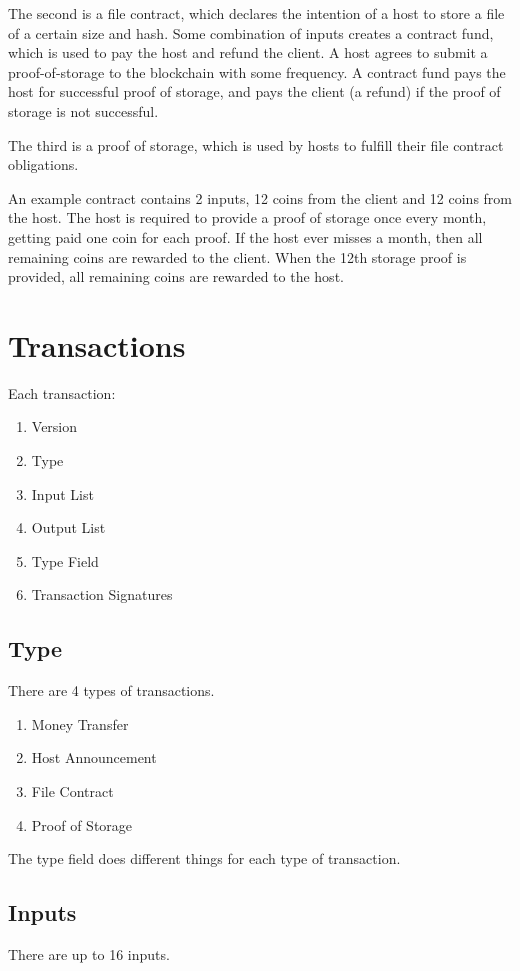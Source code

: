 \documentclass[twocolumn]{article}
\begin{document}
The second is a file contract, which declares the intention of a host to store a file of a certain size and hash.
Some combination of inputs creates a contract fund, which is used to pay the host and refund the client.
A host agrees to submit a proof-of-storage to the blockchain with some frequency.
A contract fund pays the host for successful proof of storage, and pays the client (a refund) if the proof of storage is not successful.

The third is a proof of storage, which is used by hosts to fulfill their file contract obligations.

An example contract contains 2 inputs, 12 coins from the client and 12 coins from the host.
The host is required to provide a proof of storage once every month, getting paid one coin for each proof.
If the host ever misses a month, then all remaining coins are rewarded to the client.
When the 12th storage proof is provided, all remaining coins are rewarded to the host.

\section{Transactions}
Each transaction:
\begin{enumerate}
	\item Version
	\item Type
	\item Input List
	\item Output List
	\item Type Field
	\item Transaction Signatures
\end{enumerate}

\subsection{Type}
There are 4 types of transactions.
\begin{enumerate}
	\item Money Transfer
	\item Host Announcement
	\item File Contract
	\item Proof of Storage
\end{enumerate}

The type field does different things for each type of transaction.

\subsection{Inputs}
There are up to 16 inputs.
\end{document}
